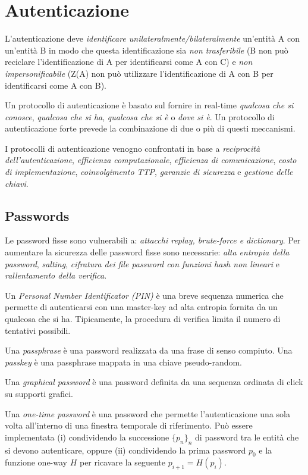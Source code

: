 \chapter{Autenticazione}
\label{chp:authentication}

L'autenticazione deve \textit{identificare unilateralmente/bilateralmente} un'entità A con un'entità B in modo che questa identificazione sia \textit{non trasferibile} (B non può reciclare l'identificazione di A per identificarsi come A con C) e \textit{non impersonificabile} (Z(A) non può utilizzare l'identificazione di A con B per identificarsi come A con B).

Un protocollo di autenticazione è basato sul fornire in real-time \textit{qualcosa che si conosce}, \textit{qualcosa che si ha}, \textit{qualcosa che si è} o \textit{dove si è}. Un protocollo di autenticazione forte prevede la combinazione di due o più di questi meccanismi.

I protocolli di autenticazione venogno confrontati in base a \textit{reciprocità dell'autenticazione}, \textit{efficienza computazionale}, \textit{efficienza di comunicazione}, \textit{costo di implementazione}, \textit{coinvolgimento TTP}, \textit{garanzie di sicurezza} e \textit{gestione delle chiavi}.


\section{Passwords}
Le password fisse sono vulnerabili a: \textit{attacchi replay, brute-force e dictionary}.
Per aumentare la sicurezza delle password fisse sono necessarie: \textit{alta entropia della password}, \textit{salting}, \textit{cifratura dei file password con funzioni hash non lineari} e \textit{rallentamento della verifica}.

Un \textit{Personal Number Identificator (PIN)} è una breve sequenza numerica che permette di autenticarsi con una master-key ad alta entropia fornita da un qualcosa che si ha. Tipicamente, la procedura di verifica limita il numero di tentativi possibili.

Una \textit{passphrase} è una password realizzata da una frase di senso compiuto. Una \textit{passkey} è una passphrase mappata in una chiave pseudo-random.

Una \textit{graphical password} è una password definita da una sequenza ordinata di click su supporti grafici.

Una \textit{one-time password} è una password che permette l'autenticazione una sola volta all'interno di una finestra temporale di riferimento. Può essere implementata (i) condividendo la successione $\{p_{n}\}_{n}$ di password tra le entità che si devono autenticare, oppure (ii) condividendo la prima password $p_{0}$ e la funzione one-way $H$ per ricavare la seguente $p_{i+1}=H(p_{i})$.


